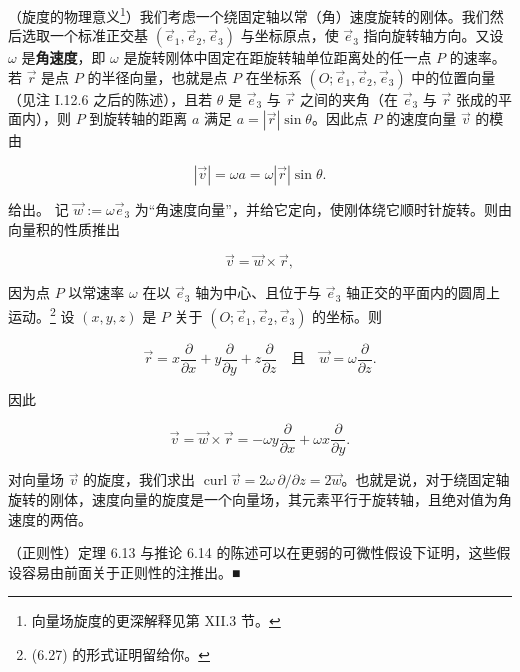 \begin{remark}
\begin{items}
\item[（c）]

（旋度的物理意义\footnote{向量场旋度的更深解释见第 XII.3 节。}）我们考虑一个绕固定轴以常（角）速度旋转的刚体。我们然后选取一个标准正交基 $ (\vec{e}_{1}, \vec{e}_{2}, \vec{e}_{3}) $ 与坐标原点，使 $ \vec{e}_{3} $ 指向旋转轴方向。又设 $ \omega $ 是\textbf{角速度}，即 $ \omega $ 是旋转刚体中固定在距旋转轴单位距离处的任一点 $ P $ 的速率。若 $ \vec{r} $ 是点 $ P $ 的半径向量，也就是点 $ P $ 在坐标系 $ (O; \vec{e}_{1}, \vec{e}_{2}, \vec{e}_{3}) $ 中的位置向量（见注 I.12.6 之后的陈述），且若 $ \theta $ 是 $ \vec{e}_{3} $ 与 $ \vec{r} $ 之间的夹角（在 $ \vec{e}_{3} $ 与 $ \vec{r} $ 张成的平面内），则 $ P $ 到旋转轴的距离 $ a $ 满足 $ a = |\vec{r}| \sin \theta $。因此点 $ P $ 的速度向量 $ \vec{v} $ 的模由

\[
|\vec{v}| = \omega a = \omega |\vec{r}| \sin \theta .
\]

给出。
记 $ \vec{w} := \omega \vec{e}_{3} $ 为“角速度向量”，并给它定向，使刚体绕它顺时针旋转。则由向量积的性质推出

\begin{equation}
\vec{v} = \vec{w} \times \vec{r} ,\tag{6.27}
\end{equation}

因为点 $ P $ 以常速率 $ \omega $ 在以 $ \vec{e}_{3} $ 轴为中心、且位于与 $ \vec{e}_{3} $ 轴正交的平面内的圆周上运动。\footnote{(6.27) 的形式证明留给你。}
设 $ (x, y, z) $ 是 $ P $ 关于 $ (O; \vec{e}_{1}, \vec{e}_{2}, \vec{e}_{3}) $ 的坐标。则

\[
\vec{r} = x \frac{\partial}{\partial x} + y \frac{\partial}{\partial y} + z \frac{\partial}{\partial z} \quad \text{且} \quad \vec{w} = \omega \frac{\partial}{\partial z} .
\]

因此

\[
\vec{v} = \vec{w} \times \vec{r} = -\omega y \frac{\partial}{\partial x} + \omega x \frac{\partial}{\partial y} .
\]

对向量场 $ \vec{v} $ 的旋度，我们求出 $ \operatorname{curl} \vec{v} = 2\omega\, \partial/\partial z = 2\vec{w} $。也就是说，对于绕固定轴旋转的刚体，速度向量的旋度是一个向量场，其元素平行于旋转轴，且绝对值为角速度的两倍。

\item[（d）]

（正则性）定理 6.13 与推论 6.14 的陈述可以在更弱的可微性假设下证明，这些假设容易由前面关于正则性的注推出。\nobreak\hspace{0.35em}■

\end{items}

\end{remark}

